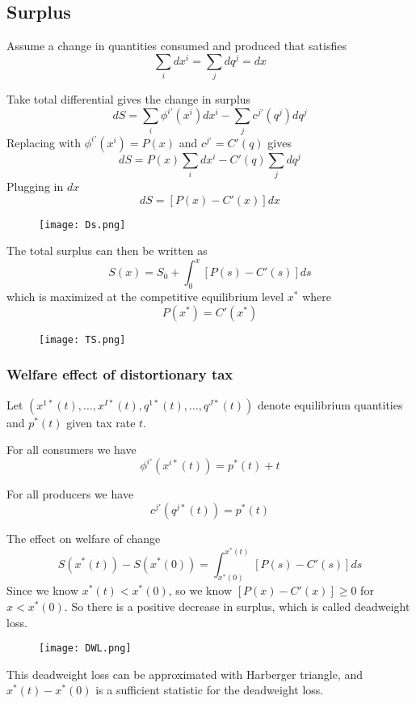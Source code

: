 \documentclass[twocolumn, fleqn]{article}
\begin{document}
		\subsection{Surplus}
						
		Assume a change in quantities consumed and produced that satisfies 
		\[ \sum_i dx^i = \sum_j dq^j = dx\]
		
		Take total differential gives the change in surplus
		\[
		dS = \sum_i \phi^{i'}(x^i) dx^i - \sum_j c^{j'}(q^j) dq^j
		\]
		Replacing with $\phi^{i \prime}(x^i) = P(x)$ and \(c^{j\prime} = C'(q)\) gives
		\[
		dS = P(x) \sum_i dx^i - C'(q) \sum_j dq^j
		\]
		Plugging in $dx$
		\[
		dS = [P(x) - C'(x)] dx
		\]
		
		\begin{figure}[h]
			\center
			\texttt{[image: Ds.png]}
		\end{figure}
		
		The total surplus can then be written as 
		\[
		S(x) = S_0 + \int_0^x [P(s) - C'(s)] ds
		\]
		which is maximized at the competitive equilibrium level $x^\ast$ where 
		\[ P(x^\ast) = C'(x^\ast)\]
		
		\begin{figure}[h]
			\center
			\texttt{[image: TS.png]}
		\end{figure}
		
		\subsubsection{Welfare effect of distortionary tax}
		Let \((x^{1*}(t), \dots, x^{I*}(t), q^{1*}(t), \dots, q^{J*}(t))\) denote equilibrium quantities and \(p^*(t)\) given tax rate \(t\).
		
		For all consumers we have 
		\[
		\phi^{i'}(x^{i*}(t)) = p^*(t) + t
		\]
		
		For all producers we have 
		\[
		c^{j'}(q^{j*}(t)) = p^*(t)
		\]
		
		The effect on welfare of change
		\[
		S(x^*(t)) - S(x^*(0)) = \int_{x^*(0)}^{x^*(t)} [P(s) - C'(s)] ds
		\]
		Since we know $x^\ast(t) < x^\ast (0)$, so we know $[P(x) - C'(x)]\geq 0$ for $x < x^\ast(0)$. So there is a positive decrease in surplus, which is called deadweight loss. 
		
		\begin{figure}[h]
			\center
			\texttt{[image: DWL.png]}
		\end{figure}
		
		This deadweight loss can be approximated with Harberger triangle, and $x^\ast (t) - x^\ast (0)$ is a sufficient statistic for the deadweight loss. \\
		
\end{document}
